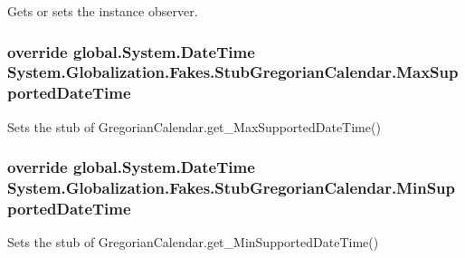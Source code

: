 Gets or sets the instance observer.

\hypertarget{class_system_1_1_globalization_1_1_fakes_1_1_stub_gregorian_calendar_abd88e19d9d0ef5c0887cda2372b35446}{
\subsubsection[{Max\-Supported\-Date\-Time}]{\setlength{\rightskip}{0pt plus 5cm}override global.\-System.\-Date\-Time System.\-Globalization.\-Fakes.\-Stub\-Gregorian\-Calendar.\-Max\-Supported\-Date\-Time\hspace{0.3cm}{\ttfamily [get]}}}\label{class_system_1_1_globalization_1_1_fakes_1_1_stub_gregorian_calendar_abd88e19d9d0ef5c0887cda2372b35446}


Sets the stub of Gregorian\-Calendar.\-get\-\_\-\-Max\-Supported\-Date\-Time()

\hypertarget{class_system_1_1_globalization_1_1_fakes_1_1_stub_gregorian_calendar_a03483d654e4d287b1fe7852bec74872c}{
\subsubsection[{Min\-Supported\-Date\-Time}]{\setlength{\rightskip}{0pt plus 5cm}override global.\-System.\-Date\-Time System.\-Globalization.\-Fakes.\-Stub\-Gregorian\-Calendar.\-Min\-Supported\-Date\-Time\hspace{0.3cm}{\ttfamily [get]}}}\label{class_system_1_1_globalization_1_1_fakes_1_1_stub_gregorian_calendar_a03483d654e4d287b1fe7852bec74872c}


Sets the stub of Gregorian\-Calendar.\-get\-\_\-\-Min\-Supported\-Date\-Time()

